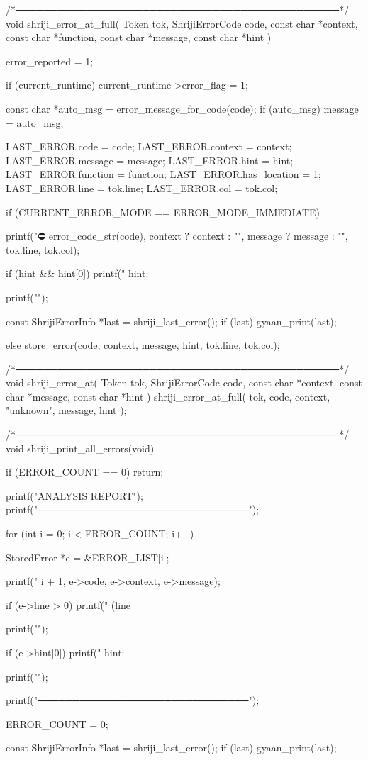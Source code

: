 \documentclass{article}
\begin{document}
/*──────────────────────────────────────────────*/
void shriji_error_at_full(
    Token tok,
    ShrijiErrorCode code,
    const char *context,
    const char *function,
    const char *message,
    const char *hint
)
{
    error_reported = 1;

    if (current_runtime) {
        current_runtime->error_flag = 1;
    }

    const char *auto_msg = error_message_for_code(code);
    if (auto_msg)
        message = auto_msg;

    LAST_ERROR.code = code;
    LAST_ERROR.context = context;
    LAST_ERROR.message = message;
    LAST_ERROR.hint = hint;
    LAST_ERROR.function = function;
    LAST_ERROR.has_location = 1;
    LAST_ERROR.line = tok.line;
    LAST_ERROR.col = tok.col;

    if (CURRENT_ERROR_MODE == ERROR_MODE_IMMEDIATE) {

        printf("\n⛔ %
               error_code_str(code),
               context ? context : "",
               message ? message : "",
               tok.line,
               tok.col);

        if (hint && hint[0])
            printf("   hint: %

        printf("\n");

        const ShrijiErrorInfo *last = shriji_last_error();
        if (last) {
            gyaan_print(last);
        }

    } else {
        store_error(code, context, message, hint, tok.line, tok.col);
    }
}


/*──────────────────────────────────────────────*/
void shriji_error_at(
    Token tok,
    ShrijiErrorCode code,
    const char *context,
    const char *message,
    const char *hint
)
{
    shriji_error_at_full(
        tok,
        code,
        context,
        "unknown",
        message,
        hint
    );
}


/*──────────────────────────────────────────────*/
void shriji_print_all_errors(void)
{
    if (ERROR_COUNT == 0) return;

    printf("\nKRST ANALYSIS REPORT\n");
    printf("──────────────────────────────\n");

    for (int i = 0; i < ERROR_COUNT; i++) {
        StoredError *e = &ERROR_LIST[i];

        printf("%
               i + 1,
               e->code,
               e->context,
               e->message);

        if (e->line > 0)
            printf(" (line %

        printf("\n");

        if (e->hint[0])
            printf("   hint: %

        printf("\n");
    }

    printf("──────────────────────────────\n\n");

    ERROR_COUNT = 0;

    const ShrijiErrorInfo *last = shriji_last_error();
    if (last) {
        gyaan_print(last);
    }
}
\end{document}
